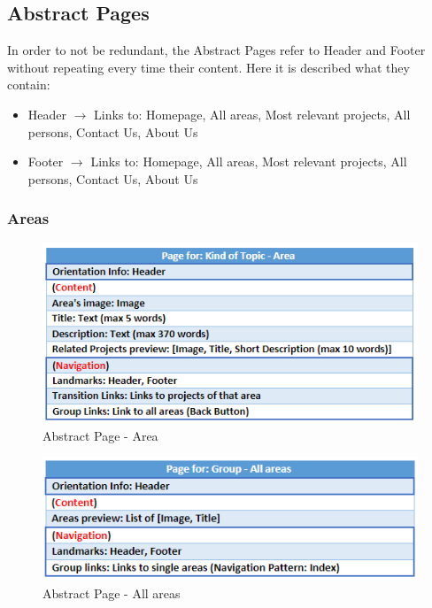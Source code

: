 \documentclass[11pt, letterpaper]{article}
\begin{document}
\subsection{Abstract Pages}
In order to not be redundant, the Abstract Pages refer to Header and Footer without repeating every time their content. Here it is described what they contain:
\begin{itemize}
    \item Header $\rightarrow$ Links to: Homepage, All areas, Most relevant projects, All persons, Contact Us, About Us
    \item Footer $\rightarrow$ Links to: Homepage, All areas, Most relevant projects, All persons, Contact Us, About Us
\end{itemize}

\subsubsection{Areas}
\begin{figure}[H]
    \centering
    \includegraphics[width=15cm]{images/Abstract Pages/AB - Area.png}
    \caption{Abstract Page - Area}
    \label{fig:AbstractPage_Area}
\end{figure}

\begin{figure}[H]
    \centering
    \includegraphics[width=15cm]{images/Abstract Pages/AB - All areas.png}
    \caption{Abstract Page - All areas}
    \label{fig:AbstractPage_All_areas}
\end{figure}
\end{document}
